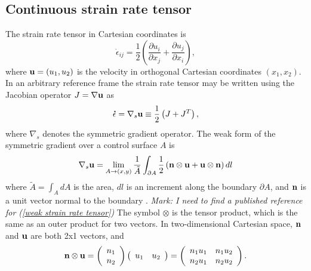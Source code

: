 \documentclass[11pt]{report}
\begin{document}
\subsection{Continuous strain rate tensor}

The strain rate tensor in Cartesian coordinates is
\begin{equation}
\dot{\epsilon}_{ij} = \frac{1}{2}\left(\frac{\partial u_i}{\partial x_j} 
                                     + \frac{\partial u_j}{\partial x_i}\right),
\end{equation}
where ${\bf u} = (u_1,u_2)$ is the velocity in orthogonal Cartesian coordinates $(x_1,x_2)$.  In an arbitrary reference frame the strain rate tensor may be written using the Jacobian operator $J=\nabla {\bf u}$ as
\begin{equation}
{\bf\dot{\epsilon}} = \nabla_s {\bf u} \equiv \frac{1}{2}\left(J + J^T\right),
\end{equation}
where $\nabla_s$ denotes the symmetric gradient operator.  The weak form of the symmetric gradient over a control surface $A$  is
\begin{equation}
\label{weak strain rate tensor}
\nabla_s {\bf u}
= \lim_{A\rightarrow(x,y)} \frac{1}{\tilde{A}} 
\int_{\partial A}\frac{1}{2}\left( 
  {\bf n}\otimes{\bf u} 
+ {\bf u}\otimes{\bf n}\right)dl
\end{equation}
where $\tilde{A} = \int_A dA$ is the area, $dl$ is an increment along the boundary $\partial A$, and ${\bf n}$ is a unit vector normal to the boundary \cite[equation 22]{Ringler06unpub}.  {\it Mark: I need to find a published reference for (\ref{weak strain rate tensor})}  The symbol $\otimes$ is the tensor product, which is the same as an outer product for two vectors.  In two-dimensional Cartesian space, ${\bf n}$ and ${\bf u}$ are both 2x1 vectors, and 
\begin{equation}
{\bf n}\otimes{\bf u} 
= \left( \begin{array}{c} n_1 \\ n_2 \end{array}   \right)
  \left( \begin{array}{cc} u_1 &  u_2 \end{array} \right)
= \left( \begin{array}{cc} n_1 u_1 & n_1 u_2 \\  n_2 u_1 & n_2 u_2 \end{array}   \right).
\end{equation}
\end{document}
